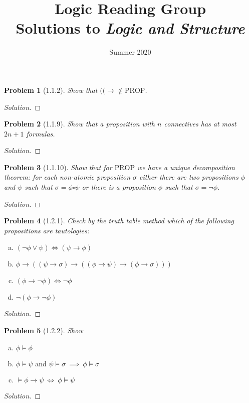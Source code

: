 \documentclass[letter]{article}
\title{Logic Reading Group\\Solutions to \textit{Logic and Structure}}
\date{Summer 2020}
\newtheorem{problem}{Problem}
\theoremstyle{definition}
\newenvironment{solution}
{\begin{proof}[Solution]}
	{\end{proof}}
\begin{document}
\maketitle
 
\newpage
\begin{problem}[1.1.2]
    Show that $(( \to \not \in \textrm{PROP}$.
\end{problem}
\begin{solution}
\end{solution}

\begin{problem}[1.1.9] Show that a proposition with $n$ connectives has at most $2n + 1$ formulas.
\end{problem}
\begin{solution}
\end{solution}

\begin{problem}[1.1.10] Show that for $\textrm{PROP}$ we have a unique decomposition theorem: for each non-atomic proposition $\sigma$ either there are two propositions $\phi$ and $\psi$ such that $\sigma = \phi \square \psi$ or there is a proposition $\phi$ such that $\sigma = \neg \phi$.
\end{problem}
\begin{solution}
\end{solution}

\begin{problem}[1.2.1] Check by the truth table method which of the following propositions are tautologies:
    \begin{enumerate}[(a)]
        \item $(\neg \phi \lor \psi) \iff (\psi \to \phi)$
        \item $\phi \to ((\psi \to \sigma)
                          \to
                          ((\phi \to \psi)
                            \to (\phi \to \sigma)
                            ))$
        \item $(\phi \to \neg \phi) \iff \neg \phi$
        \item $\neg (\phi \to \neg \phi)$
    \end{enumerate}
\end{problem}
\begin{solution}
\end{solution}

\begin{problem}[1.2.2] Show
    \begin{enumerate}[(a)]
        \item $\phi \models \phi$
        \item $\phi \models \psi \textrm{ and } \psi \models \sigma \> \implies \> \phi \models \sigma$
        \item $\models \phi \to \psi \> \iff \> \phi \models \psi$
    \end{enumerate}
\end{problem}
\begin{solution}
\end{solution}
\end{document}
